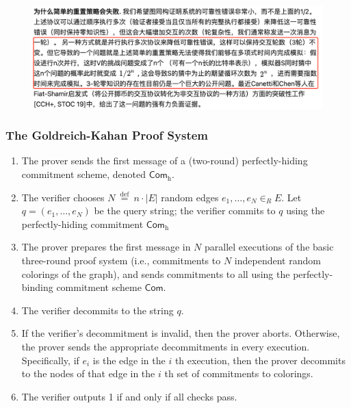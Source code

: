 \documentclass{beamer}
\begin{document}
    \begin{frame}
        \frametitle{}
    
        \begin{figure}
            \includegraphics[scale=0.25]{deng.png}
        \end{figure}
    
    \end{frame}
    \begin{frame}
        \frametitle{The Goldreich-Kahan Proof System}
        \begin{enumerate}
            \item The prover sends the first message of a (two-round) perfectly-hiding commitment scheme, denoted $\mathsf{Com}_{\mathrm{h}} .$ 
            \item The verifier chooses $N \stackrel{\text { def }}{=} n \cdot|E|$ random edges $e_{1}, \ldots, e_{N} \in_{R} E$. Let $q=\left(e_{1}, \ldots, e_{N}\right)$ be the query string; the verifier commits to $q$ using the perfectly-hiding commitment $\mathsf{Com}_{\mathrm{h}}$
            \item The prover prepares the first message in $N$ parallel executions of the basic three-round proof system  (i.e., commitments to $N$ independent random colorings of the graph), and sends commitments to all using the perfectly-binding commitment scheme $\mathsf{Com}$.
            \item The verifier decommits to the string $q$.
            \item If the verifier's decommitment is invalid, then the prover aborts. Otherwise, the prover sends the appropriate decommitments in every execution. Specifically, if $e_{i}$ is the edge in the $i$ th execution, then the prover decommits to the nodes of that edge in the $i$ th set of commitments to colorings.
            \item The verifier outputs 1 if and only if all checks pass.
        \end{enumerate}
    
        
    
    \end{frame}
    
\end{document}

